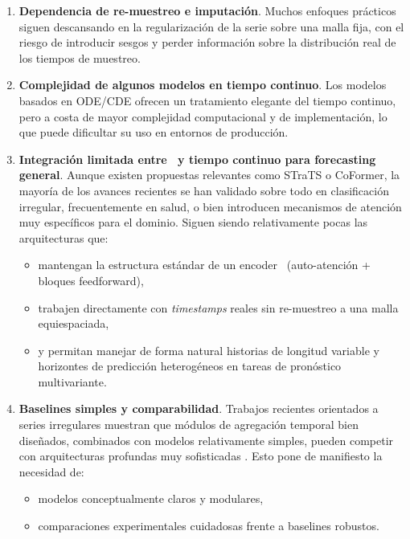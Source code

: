 \begin{enumerate}
    \item \textbf{Dependencia de re-muestreo e imputación}. Muchos enfoques prácticos siguen descansando en la regularización de la serie sobre una malla fija, con el riesgo de introducir sesgos y perder información sobre la distribución real de los tiempos de muestreo.
    \item \textbf{Complejidad de algunos modelos en tiempo continuo}. Los modelos basados en ODE/CDE ofrecen un tratamiento elegante del tiempo continuo, pero a costa de mayor complejidad computacional y de implementación, lo que puede dificultar su uso en entornos de producción.
    \item \textbf{Integración limitada entre \Transformers\ y tiempo continuo para forecasting general}. Aunque existen propuestas relevantes como STraTS o CoFormer, la mayoría de los avances recientes se han validado sobre todo en clasificación irregular, frecuentemente en salud, o bien introducen mecanismos de atención muy específicos para el dominio. Siguen siendo relativamente pocas las arquitecturas que:
    \begin{itemize}
        \item mantengan la estructura estándar de un encoder \Transformer\ (auto-atención + bloques feedforward),
        \item trabajen directamente con \emph{timestamps} reales sin re-muestreo a una malla equiespaciada,
        \item y permitan manejar de forma natural historias de longitud variable y horizontes de predicción heterogéneos en tareas de pronóstico multivariante.
    \end{itemize}
    \item \textbf{Baselines simples y comparabilidad}. Trabajos recientes orientados a series irregulares muestran que módulos de agregación temporal bien diseñados, combinados con modelos relativamente simples, pueden competir con arquitecturas profundas muy sofisticadas \cite{liu2025rethinking}. Esto pone de manifiesto la necesidad de:
    \begin{itemize}
        \item modelos conceptualmente claros y modulares,
        \item comparaciones experimentales cuidadosas frente a baselines robustos.
    \end{itemize}
\end{enumerate}

